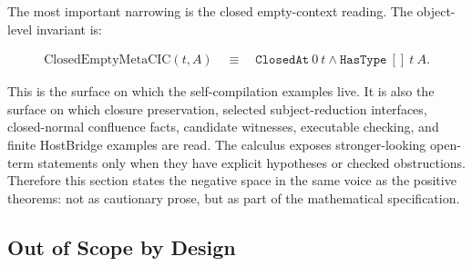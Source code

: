 The most important narrowing is the closed empty-context reading.  The
object-level invariant is:

$$
\begin{aligned}
  \mathrm{ClosedEmptyMetaCIC}(t,A)
  \quad\equiv\quad
  \texttt{ClosedAt}\ 0\ t
  \land
  \texttt{HasType}\ []\ t\ A .
\end{aligned}
$$

This is the surface on which the self-compilation examples live.  It is also
the surface on which closure preservation, selected subject-reduction
interfaces, closed-normal confluence facts, candidate witnesses, executable
checking, and finite HostBridge examples are read.  The calculus exposes
stronger-looking open-term statements only when they have explicit hypotheses
or checked obstructions.  Therefore this section states the negative space in
the same voice as the positive theorems: not as cautionary prose, but as part
of the mathematical specification.

\subsection{Out of Scope by Design}
\label{subsec:metacic-out-of-scope-by-design}


